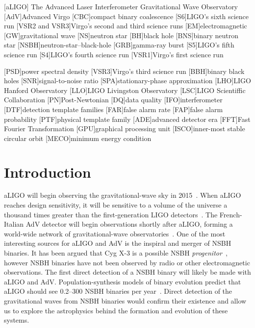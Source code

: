 


[aLIGO]
{The Advanced Laser Interferometer Gravitational Wave Observatory}
[AdV]{Advanced Virgo}
[CBC]{compact binary coalescence}
[S6]{LIGO's sixth science run}
[VSR2 and VSR3]{Virgo's second and third science runs}
[EM]{electromagnetic}
[GW]{gravitational wave}
[NS]{neutron star}
[BH]{black hole}
[BNS]{binary neutron star}
[NSBH]{neutron-star--black-hole}
[GRB]{gamma-ray burst}
[S5]{LIGO's fifth science run}
[S4]{LIGO's fourth science run}
[VSR1]{Virgo's first science run}

[PSD]{power spectral density}
[VSR3]{Virgo's third science run}
[BBH]{binary black holes}
[SNR]{signal-to-noise ratio}
[SPA]{stationary-phase approximation}
[LHO]{LIGO Hanford Observatory}
[LLO]{LIGO Livingston Observatory}
[LSC]{LIGO Scientiffic Collaboration}
[PN]{Post-Newtonian}
[DQ]{data quality}
[IFO]{interferometer}
[DTF]{detection template families}
[FAR]{false alarm rate}
[FAP]{false alarm probability}
[PTF]{physical template family}
[ADE]{advanced detector era}
[FFT]{Fast Fourier Transformation}
[GPU]{graphical processing unit}
[ISCO]{inner-most stable circular orbit}
[MECO]{minimum energy condition}

\section{Introduction}
\label{sec:intro}

\ac{aLIGO} will
begin observing the gravitational-wave sky in 2015~\cite{Aasi:2013wya}. When
\ac{aLIGO} reaches design sensitivity, it will be sensitive to a volume of the
universe a thousand times greater than the first-generation LIGO
detectors~\cite{Harry:2010zz}. The French-Italian \ac{AdV} detector
will begin observations shortly after \ac{aLIGO}, forming a world-wide network
of gravitational-wave
observatories~\cite{Aasi:2013wya,aVirgo,AdV2}.
One of the most interesting sources for \ac{aLIGO} and \ac{AdV} is the inspiral
and merger of \ac{NSBH} binaries. It has been argued that
Cyg X-3 is a possible \ac{NSBH} \emph{progenitor}~\cite{Belczynski:2012jc},
however \ac{NSBH} binaries have not been observed by radio or other
electromagnetic observations. The first direct detection of a \ac{NSBH} binary
will likely be made with \ac{aLIGO} and \ac{AdV}. Population-synthesis models 
of binary evolution predict
that \ac{aLIGO} should see 0.2--300 \ac{NSBH} binaries per
year~\cite{Abadie:2010cf}. Direct detection of the gravitational waves from NSBH
binaries would confirm their existence and allow us to explore the astrophysics
behind the formation and evolution of these systems.

